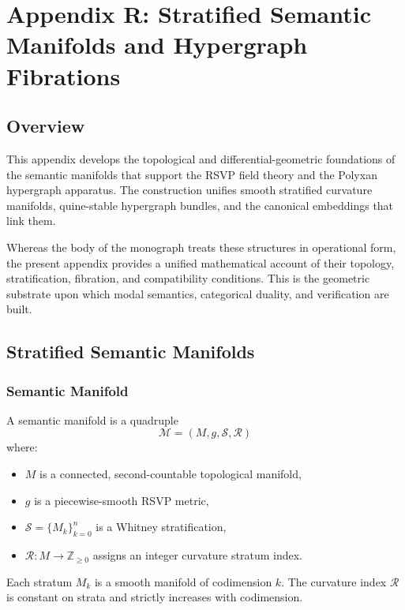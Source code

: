 \chapter*{Appendix R: Stratified Semantic Manifolds and Hypergraph Fibrations}

\section{Overview}

This appendix develops the topological and differential-geometric foundations of the semantic manifolds that support the RSVP field theory and the Polyxan hypergraph apparatus. The construction unifies smooth stratified curvature manifolds, quine-stable hypergraph bundles, and the canonical embeddings that link them.

Whereas the body of the monograph treats these structures in operational form, the present appendix provides a unified mathematical account of their topology, stratification, fibration, and compatibility conditions. This is the geometric substrate upon which modal semantics, categorical duality, and verification are built.

\section{Stratified Semantic Manifolds}

\subsection{Semantic Manifold}

A semantic manifold is a quadruple
\[
\mathcal{M} = (M,g,\mathcal{S},\mathcal{R})
\]
where:
\begin{itemize}
\item $M$ is a connected, second-countable topological manifold,
\item $g$ is a piecewise-smooth RSVP metric,
\item $\mathcal{S} = \{M_k\}_{k=0}^n$ is a Whitney stratification,
\item $\mathcal{R} : M \to \mathbb{Z}_{\ge 0}$ assigns an integer curvature stratum index.
\end{itemize}

Each stratum $M_k$ is a smooth manifold of codimension $k$. The curvature index $\mathcal{R}$ is constant on strata and strictly increases with codimension.

